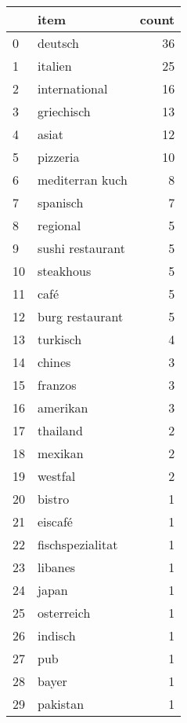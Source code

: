 \begin{tabular}{llr}
\toprule
{} &              item &  count \\
\midrule
0  &           deutsch &     36 \\
1  &           italien &     25 \\
2  &     international &     16 \\
3  &        griechisch &     13 \\
4  &             asiat &     12 \\
5  &          pizzeria &     10 \\
6  &   mediterran kuch &      8 \\
7  &          spanisch &      7 \\
8  &          regional &      5 \\
9  &  sushi restaurant &      5 \\
10 &         steakhous &      5 \\
11 &              café &      5 \\
12 &   burg restaurant &      5 \\
13 &          turkisch &      4 \\
14 &            chines &      3 \\
15 &           franzos &      3 \\
16 &          amerikan &      3 \\
17 &          thailand &      2 \\
18 &           mexikan &      2 \\
19 &           westfal &      2 \\
20 &            bistro &      1 \\
21 &           eiscafé &      1 \\
22 &  fischspezialitat &      1 \\
23 &           libanes &      1 \\
24 &             japan &      1 \\
25 &        osterreich &      1 \\
26 &           indisch &      1 \\
27 &               pub &      1 \\
28 &             bayer &      1 \\
29 &          pakistan &      1 \\
\bottomrule
\end{tabular}
